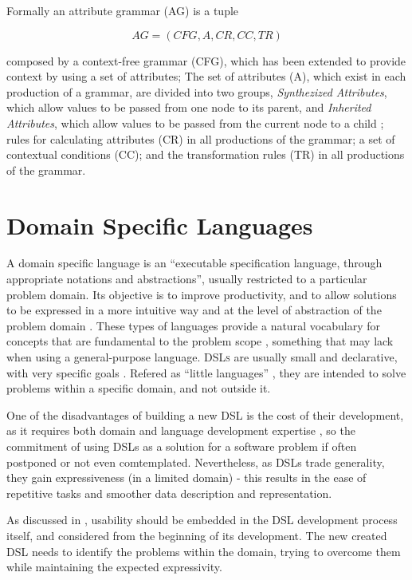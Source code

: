 \noindent Formally an attribute grammar (AG) is a tuple \cite{pereira_2016}

\[ AG = (CFG, A, CR, CC, TR) \]

\noindent composed by a context-free grammar (CFG), which has been extended to provide context by using a set of attributes; 
The set of attributes (A), which exist in each production of a grammar, are divided into two groups, \emph{Synthezized Attributes}, which allow values to be passed from one node to its parent, 
and \emph{Inherited Attributes}, which allow values to be passed from the current node to a child \cite{slonneger_1995}; 
rules for calculating attributes (CR) in all productions of the grammar; 
a set of contextual conditions (CC); 
and the transformation rules (TR) in all productions of the grammar.


\section{Domain Specific Languages}
A domain specific language is an ``executable specification language, through appropriate notations and abstractions'', usually restricted to a particular problem domain. 
Its objective is to improve productivity, and to allow solutions to be expressed in a more intuitive way and at the level of abstraction of the problem domain \cite{van_2000}.
These types of languages provide a natural vocabulary for concepts that are fundamental to the problem scope \cite{bruce_1997}, something that may lack when using a general-purpose language. 
\textsc{DSLs} are usually small and declarative, with very specific goals \cite{van_2000}.
Refered as ``little languages'' \cite{bentley_1986}, they are intended to solve problems within a specific domain, and not outside it.

One of the disadvantages of building a new \textsc{DSL} is the cost of their development, as it requires both domain and language development expertise \cite{kosar_2008},
so the commitment of using \textsc{DSL}s as a solution for a software problem if often postponed or not even comtemplated.
Nevertheless, as \textsc{DSL}s trade generality, they gain expressiveness (in a limited domain) - this results in the ease of repetitive tasks and smoother data
description \cite{mernik_2005} and representation.

As discussed in \cite{barisic_2012}, usability should be embedded in the \textsc{DSL} development process itself, and considered from the beginning of its development.
The new created \textsc{DSL} needs to identify the problems within the domain, trying to overcome them while maintaining the expected expressivity.


